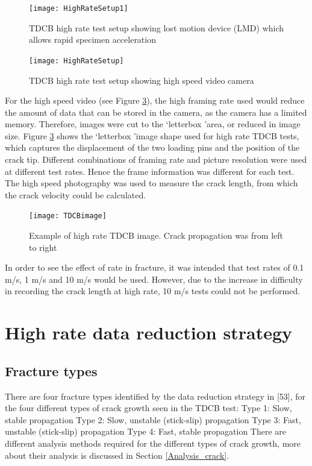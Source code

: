 \documentclass[numbers=noendperiod,chapterprefix=on]{icldt} %
\begin{document}
\begin{figure}[!htpb]
\centering
\texttt{[image: HighRateSetup1]}
\caption{TDCB high rate test setup showing lost motion device (LMD) which allows rapid specimen acceleration \cite{Adnan2008}} \label{HighRateSetup1}
\end{figure}
\FloatBarrier
\begin{figure}[!htpb]
\centering
\texttt{[image: HighRateSetup]}
\caption{TDCB high rate test setup showing high speed video camera \cite{Adnan2008}} \label{HighRateSetup}
\end{figure}
\FloatBarrier
For the high speed video (see Figure \ref{TDCBimage}), the high framing rate used would reduce the amount of data that can be stored in the camera, as the camera has a limited memory. Therefore, images were cut to the \textquoteleft letterbox \textquoteright area, or reduced in image size. Figure \ref{TDCBimage} shows the \textquoteleft letterbox \textquoteright image shape used for high rate TDCB tests, which captures the displacement of the two loading pins and the position of the crack tip. Different combinations of framing rate and picture resolution were used at different test rates. Hence the frame information was different for each test. The high speed photography was used to measure the crack length, from which the crack velocity could be calculated.

\begin{figure}[!htpb]
\centering
\texttt{[image: TDCBimage]}
\caption{Example of high rate TDCB image. Crack propagation was from left to right} \label{TDCBimage}
\end{figure}
\FloatBarrier
In order to see the effect of rate in fracture, it was intended that test rates of 0.1 m/s, 1 m/s and 10 m/s would be used. However, due to the increase in difficulty in recording the crack length at high rate, 10 m/s tests could not be performed.

\section{High rate data reduction strategy} \label{data_reduction}
\subsection{Fracture types}
There are four fracture types identified by the data reduction strategy in [53], for the four different types of crack growth  seen in the TDCB test:
\newline
Type 1: Slow, stable propagation
\newline
Type 2: Slow, unstable (stick-slip) propagation
\newline
Type 3: Fast, unstable (stick-slip) propagation
\newline
Type 4: Fast, stable propagation
\newline
There are different analysis methods required for the different types of crack growth, more about their analysis is discussed in Section \ref{Analysis_crack}. 
\end{document}
